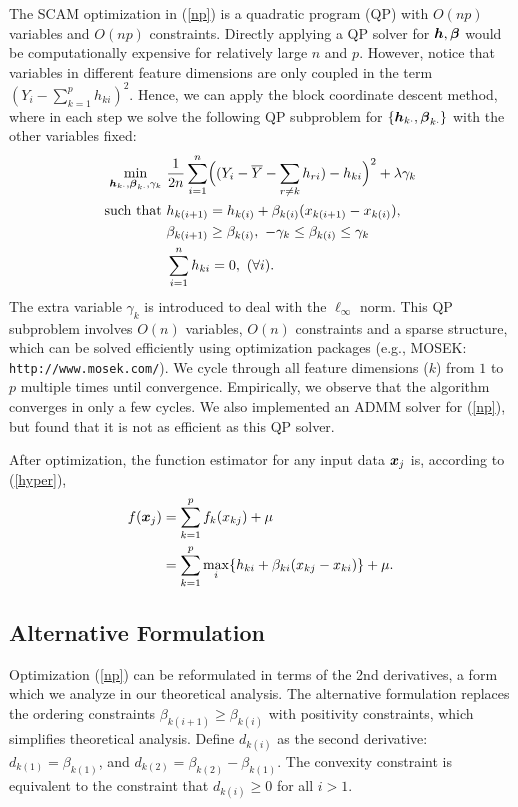 The SCAM optimization in (\ref{np}) is a quadratic program (QP) with
$O(np)$ variables and $O(np)$ constraints. 
Directly applying a QP solver for $\boldsymbol{h},
\boldsymbol{\beta}$ would be computationally expensive for relatively large
$n$ and $p$. However, notice that variables in different feature
dimensions are only coupled in the term
$(Y_{i}-\sum_{k=1}^{p}h_{ki})^{2}$. Hence, we can apply the block
coordinate descent method, where in each step we solve the following
QP subproblem for $\{\boldsymbol{h}_{k\cdot},\boldsymbol{\beta}_{k\cdot}\}$ with the
other variables fixed:
\begin{equation}
\begin{split}\nonumber
       \min_{\bds{h}_{k\cdot},\bds{\beta}_{k\cdot},\gamma_{k}} &
             \ \frac{1}{2n}\sum_{i=1}^{n}\Bigl((Y_{i}-\bar{Y}
                -\sum_{r\neq{k}}h_{ri})-h_{ki}\Bigr)^{2} 
                      + \lambda\gamma_{k} \\
        \textrm{such that} & \ h_{k(i+1)} = h_{k(i)} + \beta_{k(i)}(x_{k(i+1)}-x_{k(i)}),\\
        &\ \beta_{k(i+1)} \geq \beta_{k(i)}, \ -\gamma_{k}\leq\beta_{k(i)}\leq\gamma_{k}\\
        &\  \sum_{i=1}^{n}h_{ki}=0, \ (\forall i).
\end{split}
\end{equation}
The extra variable $\gamma_{k}$ is introduced to deal with the $\ell_{\infty}$ norm. This QP subproblem involves $O(n)$ variables, $O(n)$ constraints and a sparse structure, 
which can be solved efficiently using optimization packages (e.g., MOSEK: \verb+http://www.mosek.com/+).  We cycle through all feature dimensions ($k$) from $1$ to $p$ multiple times until convergence.
Empirically, we observe that the algorithm converges in only a few cycles. We also implemented an ADMM solver for (\ref{np}), but found that it is not as efficient as this QP solver.

After optimization, the function estimator for any input data $\boldsymbol{x}_j$ is, according to (\ref{hyper}),
\begin{equation}
\begin{split}
\nonumber
      f(\boldsymbol{x}_j) & = \sum_{k=1}^{p}f_k(x_{kj})+\mu \\ 
    & = \sum_{k=1}^{p}\max_{i} \{h_{ki}+\beta_{ki}(x_{kj}-x_{ki})\} +
      \mu.
\end{split}
\end{equation} 


\subsection{Alternative Formulation}
Optimization (\ref{np}) can be reformulated in terms of the 2nd derivatives, a form which we analyze in our theoretical analysis. The alternative formulation replaces the ordering
constraints $\beta_{k(i+1)} \geq \beta_{k(i)}$ with positivity
constraints, which simplifies theoretical analysis.
Define $d_{k(i)}$ as the second derivative:
$d_{k(1)} = \beta_{k(1)}$, and $d_{k(2)} =
\beta_{k(2)} - \beta_{k(1)}$. The convexity constraint is
equivalent to the constraint that $d_{k(i)} \geq 0$ for all $i >
1$.

